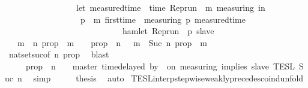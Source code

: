 \begin{isabellebody}
\ \ \ \ \ \ \ \ \ \ \ \ \ \ \ \ \ {\isacharparenleft}let\ measured{\isacharunderscore}time\ {\isacharequal}\ time\ {\isacharparenleft}{\isacharparenleft}Rep{\isacharunderscore}run\ {\isasymrho}{\isacharparenright}\ m\ measuring{\isacharparenright}\ in\isanewline
\ \ \ \ \ \ \ \ \ \ \ \ \ \ \ \ \ \ {\isasymforall}p\ {\isasymge}\ m{\isachardot}\ first{\isacharunderscore}time\ {\isasymrho}\ measuring\ p\ {\isacharparenleft}measured{\isacharunderscore}time\ {\isacharplus}\ {\isasymdelta}{\isasymtau}{\isacharparenright}\isanewline
\ \ \ \ \ \ \ \ \ \ \ \ \ \ \ \ \ \ \ \ \ \ \ \ \ \ \ {\isasymlongrightarrow}\ hamlet\ {\isacharparenleft}{\isacharparenleft}Rep{\isacharunderscore}run\ {\isasymrho}{\isacharparenright}\ p\ slave{\isacharparenright}{\isacharparenright}{\isacartoucheclose}\isanewline
\ \ \isamarkupfalse%
\ {\isacartoucheopen}{\isacharbraceleft}\ {\isasymrho}{\isachardot}\ {\isasymforall}m\ {\isasymge}\ n{\isachardot}\ {\isacharquery}prop\ {\isasymrho}\ m{\isacharbraceright}\ {\isacharequal}\ {\isacharbraceleft}\ {\isasymrho}{\isachardot}\ {\isacharquery}prop\ {\isasymrho}\ n{\isacharbraceright}\ {\isasyminter}\ {\isacharbraceleft}{\isasymrho}{\isachardot}\ {\isasymforall}m\ {\isasymge}\ Suc\ n{\isachardot}\ {\isacharquery}prop\ {\isasymrho}\ m{\isacharbraceright}{\isacartoucheclose}\isanewline
\ \ \ \ \isamarkupfalse%
\ nat{\isacharunderscore}set{\isacharunderscore}suc{\isacharbrackleft}of\ {\isacartoucheopen}n{\isacartoucheclose}\ {\isacharquery}prop{\isacharbrackright}\ \isamarkupfalse%
\ blast\isanewline
\ \ \isamarkupfalse%
\ \isamarkupfalse%
\ {\isacartoucheopen}{\isachardot}{\isachardot}{\isachardot}\ {\isacharequal}\ {\isacharbraceleft}\ {\isasymrho}{\isachardot}\ {\isacharquery}prop\ {\isasymrho}\ n\ {\isacharbraceright}\ {\isasyminter}\ {\isasymlbrakk}\ master\ time{\isacharminus}delayed\ by\ {\isasymdelta}{\isasymtau}\ on\ measuring\ implies\ slave\ {\isasymrbrakk}\isactrlsub T\isactrlsub E\isactrlsub S\isactrlsub L\isactrlbsup {\isasymge}\ Suc\ n\isactrlesup {\isacartoucheclose}\ \isamarkupfalse%
\ simp\isanewline
\ \ \isamarkupfalse%
\ \isamarkupfalse%
\ {\isacharquery}thesis\ \isamarkupfalse%
\ auto\isanewline
{}\isamarkupfalse%
%
\endisatagproof
{\isafoldproof}%
%
\isadelimproof
\isanewline
%
\endisadelimproof
\isanewline
{}\isamarkupfalse%
\ TESL{\isacharunderscore}interp{\isacharunderscore}stepwise{\isacharunderscore}weakly{\isacharunderscore}precedes{\isacharunderscore}coind{\isacharunderscore}unfold{\isacharcolon}\isanewline

\end{isabellebody}
